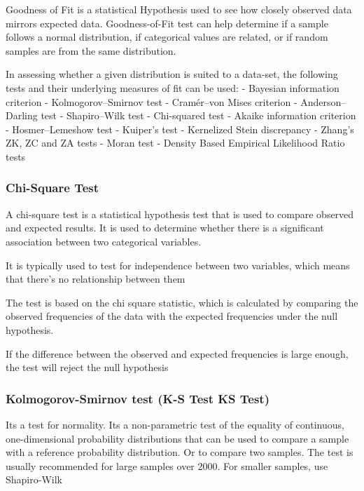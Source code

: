 \documentclass[11pt]{article}
\begin{document}
Goodness of Fit is a statistical Hypothesis used to see how closely
observed data mirrors expected data. Goodness-of-Fit test can help
determine if a sample follows a normal distribution, if categorical
values are related, or if random samples are from the same distribution.

In assessing whether a given distribution is suited to a data-set, the
following tests and their underlying measures of fit can be used: -
Bayesian information criterion - Kolmogorov--Smirnov test - Cramér--von
Mises criterion - Anderson--Darling test - Shapiro--Wilk test -
Chi-squared test - Akaike information criterion - Hosmer--Lemeshow test
- Kuiper's test - Kernelized Stein discrepancy - Zhang's ZK, ZC and ZA
tests - Moran test - Density Based Empirical Likelihood Ratio tests

\hypertarget{chi-square-test}{%
\subsubsection{Chi-Square Test}\label{chi-square-test}}

A chi-square test is a statistical hypothesis test that is used to
compare observed and expected results. It is used to determine whether
there is a significant association between two categorical variables.

It is typically used to test for independence between two variables,
which means that there's no relationship between them

The test is based on the chi square statistic, which is calculated by
comparing the observed frequencies of the data with the expected
frequencies under the null hypothesis.

If the difference between the observed and expected frequencies is large
enough, the test will reject the null hypothesis

\hypertarget{kolmogorov-smirnov-test-k-s-test-ks-test}{%
\subsubsection{Kolmogorov-Smirnov test (K-S Test \textbar{} KS
Test)}\label{kolmogorov-smirnov-test-k-s-test-ks-test}}

Its a test for normality. Its a non-parametric test of the equality of
continuous, one-dimensional probability distributions that can be used
to compare a sample with a reference probability distribution. Or to
compare two samples. The test is usually recommended for large samples
over 2000. For smaller samples, use Shapiro-Wilk
\end{document}
